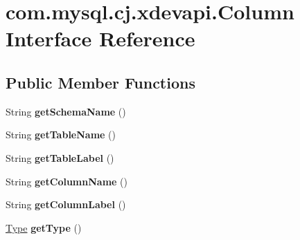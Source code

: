 \hypertarget{interfacecom_1_1mysql_1_1cj_1_1xdevapi_1_1_column}{}\section{com.\+mysql.\+cj.\+xdevapi.\+Column Interface Reference}
\label{interfacecom_1_1mysql_1_1cj_1_1xdevapi_1_1_column}
\subsection*{Public Member Functions}
\begin{DoxyCompactItemize}
\item 
\mbox{\label{interfacecom_1_1mysql_1_1cj_1_1xdevapi_1_1_column_a7bd8bc89547c4033cc4518be120a2334}} 
String {\bfseries get\+Schema\+Name} ()
\item 
\mbox{\label{interfacecom_1_1mysql_1_1cj_1_1xdevapi_1_1_column_a118feb37fd110dc65ca175435dbc917a}} 
String {\bfseries get\+Table\+Name} ()
\item 
\mbox{\label{interfacecom_1_1mysql_1_1cj_1_1xdevapi_1_1_column_a8a8627fbc15444ed0a8d6505b26d60f7}} 
String {\bfseries get\+Table\+Label} ()
\item 
\mbox{\label{interfacecom_1_1mysql_1_1cj_1_1xdevapi_1_1_column_a3de92d602b5040a47733a4ccd0ef15df}} 
String {\bfseries get\+Column\+Name} ()
\item 
\mbox{\label{interfacecom_1_1mysql_1_1cj_1_1xdevapi_1_1_column_a13965110411dd642f3673e2d7abaaf78}} 
String {\bfseries get\+Column\+Label} ()
\item 
\mbox{\label{interfacecom_1_1mysql_1_1cj_1_1xdevapi_1_1_column_a1719a0796fcb7e84cdd4f0eaaa5f39d4}} 
\mbox{\hyperlink{enumcom_1_1mysql_1_1cj_1_1xdevapi_1_1_type}{Type}} {\bfseries get\+Type} ()
\item 
\mbox{\label{interfacecom_1_1mysql_1_1cj_1_1xdevapi_1_1_column_a78cbbff61219f8ade2f43bf49dce4c58}} 

\end{DoxyCompactItemize}
